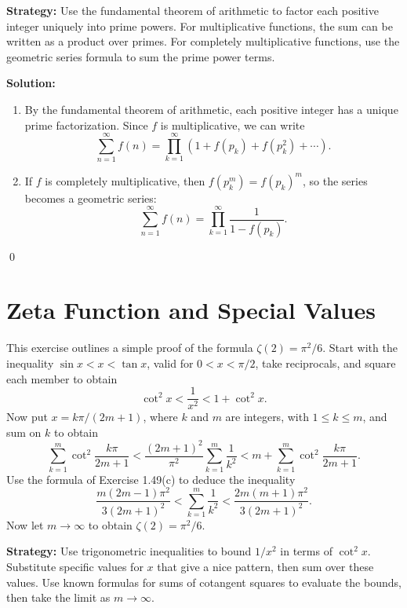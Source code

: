 \noindent\textbf{Strategy:} Use the fundamental theorem of arithmetic to factor each positive integer uniquely into prime powers. For multiplicative functions, the sum can be written as a product over primes. For completely multiplicative functions, use the geometric series formula to sum the prime power terms.

\bigskip\noindent\textbf{Solution:}
\begin{enumerate}[label=(\alph*)]
\item By the fundamental theorem of arithmetic, each positive integer has a unique prime factorization. Since \(f\) is multiplicative, we can write
\[\sum_{n=1}^{\infty} f(n) = \prod_{k=1}^{\infty} (1 + f(p_k) + f(p_k^2) + \cdots).\]

\item If \(f\) is completely multiplicative, then \(f(p_k^m) = f(p_k)^m\), so the series becomes a geometric series:
\[\sum_{n=1}^{\infty} f(n) = \prod_{k=1}^{\infty} \frac{1}{1 - f(p_k)}.\]
\end{enumerate}\qed

\section{Zeta Function and Special Values}



\begin{problembox}
\begin{problemstatement}
This exercise outlines a simple proof of the formula \(\zeta(2) = \pi^2/6\). Start with the inequality \(\sin x < x < \tan x\), valid for \(0 < x < \pi/2\), take reciprocals, and square each member to obtain
\[\cot^2 x < \frac{1}{x^2} < 1 + \cot^2 x.\]
Now put \(x = k\pi/(2m + 1)\), where \(k\) and \(m\) are integers, with \(1 \leq k \leq m\), and sum on \(k\) to obtain
\[\sum_{k=1}^{m} \cot^2 \frac{k\pi}{2m + 1} < \frac{(2m + 1)^2}{\pi^2} \sum_{k=1}^{m} \frac{1}{k^2} < m + \sum_{k=1}^{m} \cot^2 \frac{k\pi}{2m + 1}.\]
Use the formula of Exercise 1.49(c) to deduce the inequality
\[\frac{m(2m - 1)\pi^2}{3(2m + 1)^2} < \sum_{k=1}^m \frac{1}{k^2} < \frac{2m(m + 1)\pi^2}{3(2m + 1)^2}.\]
Now let \(m \to \infty\) to obtain \(\zeta(2) = \pi^2/6\).
\end{problemstatement}
\end{problembox}

\noindent\textbf{Strategy:} Use trigonometric inequalities to bound \(1/x^2\) in terms of \(\cot^2 x\). Substitute specific values for \(x\) that give a nice pattern, then sum over these values. Use known formulas for sums of cotangent squares to evaluate the bounds, then take the limit as \(m \to \infty\).


